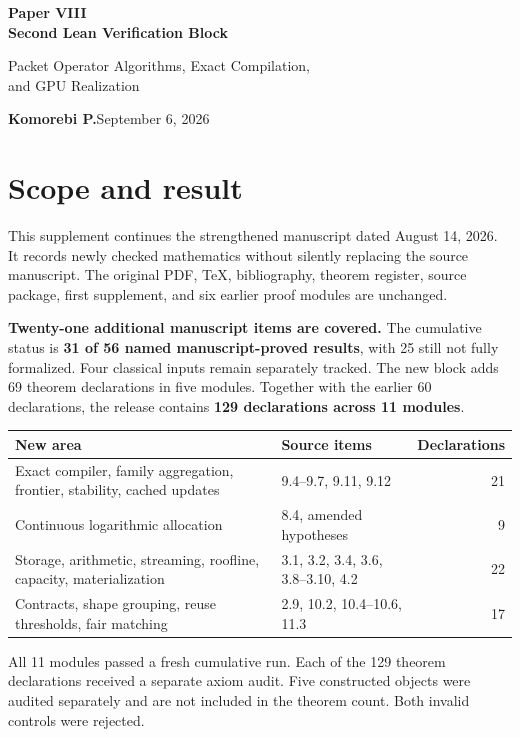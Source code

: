 \documentclass[11pt]{article}
\begin{document}
\thispagestyle{fancy}
{\LARGE\bfseries\color{ink} Paper VIII\\[3pt] Second Lean Verification Block}\par
{\large Packet Operator Algorithms, Exact Compilation,\\and GPU Realization}\par
\textbf{Komorebi P.}\hfill September 6, 2026

\section*{\color{ink}Scope and result}
This supplement continues the strengthened manuscript dated August 14, 2026. It records newly checked mathematics without silently replacing the source manuscript. The original PDF, TeX, bibliography, theorem register, source package, first supplement, and six earlier proof modules are unchanged.

\textbf{Twenty-one additional manuscript items are covered.} The cumulative status is \textbf{31 of 56 named manuscript-proved results}, with 25 still not fully formalized. Four classical inputs remain separately tracked. The new block adds 69 theorem declarations in five modules. Together with the earlier 60 declarations, the release contains \textbf{129 declarations across 11 modules}.

\begin{center}\small
\renewcommand{\arraystretch}{1.26}
\begin{tabular}{@{}p{}p{}r@{}}
\toprule
New area & Source items & Declarations\\
\midrule
Exact compiler, family aggregation, frontier, stability, cached updates & 9.4--9.7, 9.11, 9.12 & 21\\
Continuous logarithmic allocation & 8.4, amended hypotheses & 9\\
Storage, arithmetic, streaming, roofline, capacity, materialization & 3.1, 3.2, 3.4, 3.6, 3.8--3.10, 4.2 & 22\\
Contracts, shape grouping, reuse thresholds, fair matching & 2.9, 10.2, 10.4--10.6, 11.3 & 17\\
\bottomrule
\end{tabular}
\end{center}

All 11 modules passed a fresh cumulative run. Each of the 129 theorem declarations received a separate axiom audit. Five constructed objects were audited separately and are not included in the theorem count. Both invalid controls were rejected.
\end{document}
